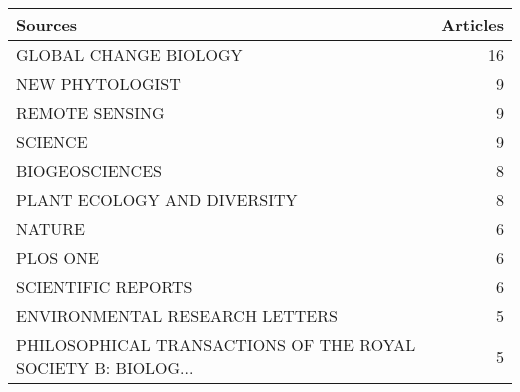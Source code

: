 
\begin{tabular}{lr}
\toprule
Sources & Articles\\
\midrule
GLOBAL CHANGE BIOLOGY & 16\\
NEW PHYTOLOGIST & 9\\
REMOTE SENSING & 9\\
SCIENCE & 9\\
BIOGEOSCIENCES & 8\\
\addlinespace
PLANT ECOLOGY AND DIVERSITY & 8\\
NATURE & 6\\
PLOS ONE & 6\\
SCIENTIFIC REPORTS & 6\\
ENVIRONMENTAL RESEARCH LETTERS & 5\\
\addlinespace
PHILOSOPHICAL TRANSACTIONS OF THE ROYAL SOCIETY B: BIOLOG... & 5\\
\bottomrule
\end{tabular}